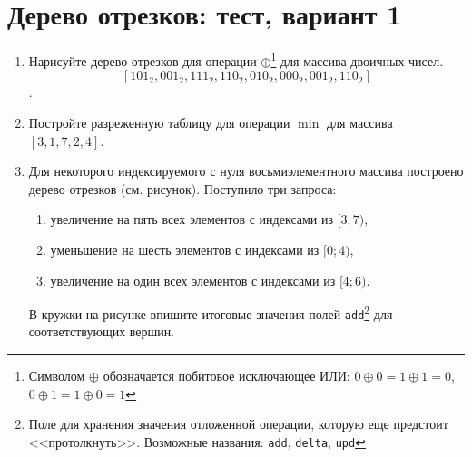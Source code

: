 \documentclass[a4paper,10pt]{article}
\begin{document}
  \section{Дерево отрезков: тест, вариант 1}

  \begin{enumerate}
    \item Нарисуйте дерево отрезков для операции
      $\oplus$\footnote{Символом $\oplus$ обозначается побитовое исключающее ИЛИ:
      $0 \oplus 0 = 1 \oplus 1 = 0$, $0 \oplus 1 = 1 \oplus 0 = 1$}
      для массива двоичных чисел.
      $$[101_2, 001_2, 111_2, 110_2, 010_2, 000_2, 001_2, 110_2]$$.

      \vskip 3cm

    \item Постройте разреженную таблицу для операции $\min$
      для массива $[3, 1, 7, 2, 4]$.

      \vskip 3cm

    \item Для некоторого индексируемого с нуля восьмиэлементного
      массива построено дерево отрезков (см. рисунок).
      Поступило три запроса:
      \begin{enumerate} 
        \item увеличение на пять всех элементов с индексами из $[3;7)$,
        \item уменьшение на шесть элементов с индексами из $[0;4)$,
        \item увеличение на один всех элементов с индексами из $[4; 6)$.
      \end{enumerate}

      В кружки на рисунке впишите итоговые значения полей
      \texttt{add}\footnote{Поле для хранения значения отложенной операции, которую еще
      предстоит <<протолкнуть>>. Возможные названия: \texttt{add}, \texttt{delta}, \texttt{upd}}
      для соответствующих вершин.


\end{enumerate}
\end{document}
